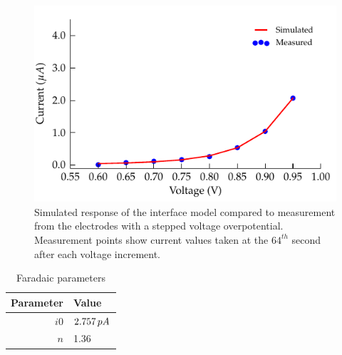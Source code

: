 \documentclass[journal, a4paper]{IEEEtran}
\begin{document}
\begin{figure}
    \begin{center}
        \includegraphics{graphics/faradaic_currentVsVoltageIEEE}
    \end{center}
    \caption{Simulated response of the interface model compared to measurement from the electrodes with a stepped voltage overpotential. Measurement points show current values taken at the $64^{th}$ second after each voltage increment.}
    \label{fig:faradaic_currentVsVoltage}
\end{figure}

\begin{table}
    \caption{Faradaic parameters}
    \label{tab:FaradaicParams}
    \begin{center}
        \begin{tabular}{r | l}
            Parameter & Value \\
            \hline
            $i0$ & $2.757\thinspace pA$\\
            $n$ & 1.36\\
        \end{tabular}
    \end{center}
\end{table}
\end{document}
